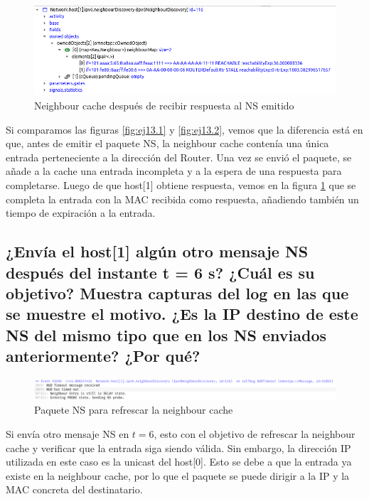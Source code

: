 \begin{figure}[h]
    \centering
    \includegraphics[width=1\textwidth]{img/ej13.3.png}
    \caption{Neighbour cache después de recibir respuesta al NS emitido}
    \label{fig:ej13.3}
\end{figure}
\begin{flushleft}
    Si comparamos las figuras \ref{fig:ej13.1} y \ref{fig:ej13.2}, vemos que la diferencia está en que, antes de emitir el paquete NS, la neighbour cache contenía una única entrada perteneciente a la dirección del Router. Una vez se envió el paquete, se añade a la cache una entrada incompleta y a la espera de una respuesta para completarse. Luego de que host[1] obtiene respuesta, vemos en la figura \ref{fig:ej13.3} que se completa la entrada con la MAC recibida como respuesta, añadiendo también un tiempo de expiración a la entrada.
\end{flushleft}

\subsection{¿Envía el host[1] algún otro mensaje NS después del instante t = 6 s? ¿Cuál es su objetivo? Muestra capturas del log en las que se muestre el motivo. ¿Es la IP destino de este NS del mismo tipo que en los NS enviados anteriormente? ¿Por qué?}

\begin{figure}[h]
    \centering
    \includegraphics[width=\textwidth]{img/ej14.1.png}
    \caption{Paquete NS para refrescar la neighbour cache}
    \label{fig:ej14.1}
\end{figure}
\begin{flushleft}
    Si envía otro mensaje NS en \(t=6\), esto con el objetivo de refrescar la neighbour cache y verificar que la entrada siga siendo válida. Sin embargo, la dirección IP utilizada en este caso es la unicast del host[0]. Esto se debe a que la entrada ya existe en la neighbour cache, por lo que el paquete se puede dirigir a la IP y la MAC concreta del destinatario.
\end{flushleft}

